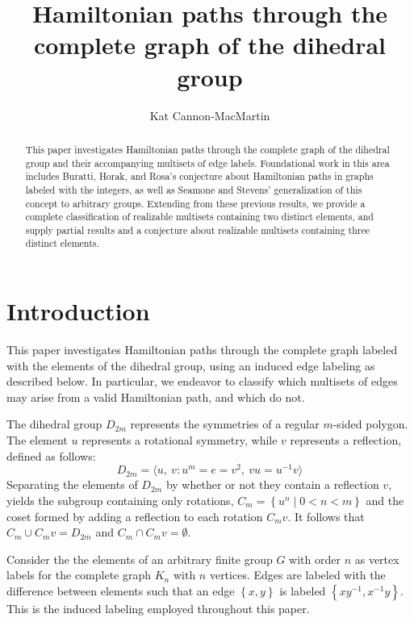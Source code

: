 \documentclass[12pt]{article}
\newcommand{\setof}[1]{\left\{#1\right\}}
\newcommand{\setdef}[2]{\left\{#1\mid#2\right\}}
\newcommand{\gen}[1]{\langle#1\rangle} %
\begin{document}
\title{Hamiltonian paths through the complete graph of the dihedral group}

\author{Kat Cannon-MacMartin}


\maketitle

\begin{abstract}
  \noindent
  This paper investigates Hamiltonian paths through the
  complete graph of the dihedral group and their accompanying multisets
  of edge labels. Foundational work in this area includes
  Buratti, Horak, and Rosa's conjecture about Hamiltonian paths in graphs
  labeled with the integers, as well as Seamone and Stevens' generalization
  of this concept to arbitrary groups. Extending from these previous results,
  we provide a complete classification of realizable multisets containing two distinct elements,
  and supply partial results and a conjecture about realizable multisets containing
  three distinct elements.
\end{abstract}
\tableofcontents
\pagebreak

\section{Introduction}
This paper investigates Hamiltonian paths through the complete graph labeled
with the elements of the dihedral group, using an induced edge labeling
as described below. In particular, we endeavor to classify
which multisets of edges may arise from a valid Hamiltonian path, and which do not.

The dihedral group $D_{2m}$ represents the symmetries of a regular $m$-sided polygon.
The element $u$ represents a rotational symmetry, while $v$ represents a reflection,
defined as follows:
$$D_{2m} = \gen{u,\ v : u^m = e = v^2,\ vu = u^{-1}v}$$ 
Separating the elements of $D_{2m}$ by whether or not they contain a
reflection $v$, yields the subgroup
containing only rotations, $C_m = \setdef{u^n}{0 < n < m}$ and the coset formed by
adding a reflection to each rotation $C_mv$. It follows
that $C_m \cup C_mv = D_{2m}$ and $C_m \cap C_mv = \emptyset$.

Consider the the elements of an arbitrary finite group $G$ with order $n$ as vertex labels for the complete graph
$K_n$ with $n$ vertices. Edges are labeled with the difference between elements
such that an edge $\setof{x, y}$ is labeled $\setof{xy^{-1}, x^{-1}y}$. This is the induced
labeling employed throughout this paper.
\end{document}
